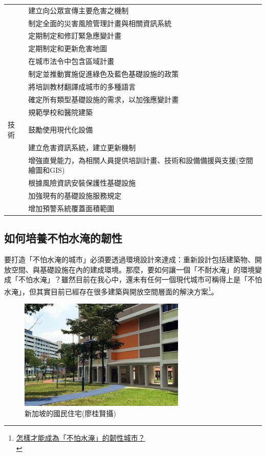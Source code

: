 \documentclass[a4paper,12pt]{article}
\begin{document}
\begin{center}
\begin{tabular}{ll}
 & 建立向公眾宣傳主要危害之機制\\
 & 制定全面的災害風險管理計畫與相關資訊系統\\
 & 定期制定和修訂緊急應變計畫\\
 & 定期制定和更新危害地圖\\
 & 在城市法令中包含區域計畫\\
 & 制定並推動實施促進綠色及藍色基礎設施的政策\\
 & 將培訓教材翻譯成城市的多種語言\\
 & 確定所有類型基礎設施的需求，以加強應變計畫\\
 & 規範學校和醫院建築\\
\hline
技術 & 鼓勵使用現代化設備\\
 & 建立危害資訊系統，建立更新機制\\
 & 增強直覺能力，為相關人員提供培訓計畫、技術和設備備援與支援(空間繪圖和GIS)\\
 & 根據風險資訊安裝保護性基礎設施\\
 & 加強現有的基礎設施服務規定\\
 & 增加預警系統覆蓋面積範圍\\
\hline
\end{tabular}
\end{center}

\subsection{如何培養不怕水淹的韌性}
\label{sec:org0aa5be3}

要打造「不怕水淹的城市」必須要透過環境設計來達成：重新設計包括建築物、開放空間、與基礎設施在內的建成環境。那麼，要如何讓一個「不耐水淹」的環境變成「不怕水淹」？雖然目前在我心中，還未有任何一個現代城市可稱得上是「不怕水淹」，但其實目前已經存在很多建築與開放空間層面的解決方案\footnote{\href{https://opinion.udn.com/opinion/story/8048/2501992}{怎樣才能成為「不怕水淹」的韌性城市？}\\\label{org3e3d25d}}。\\

\begin{figure}[htbp]
\centering
\includegraphics[width=300]{images/161236830052927_P3592718.jpg}
\caption{\label{fig:FigName}新加坡的國民住宅(廖桂賢攝)}
\end{figure}
\end{document}
